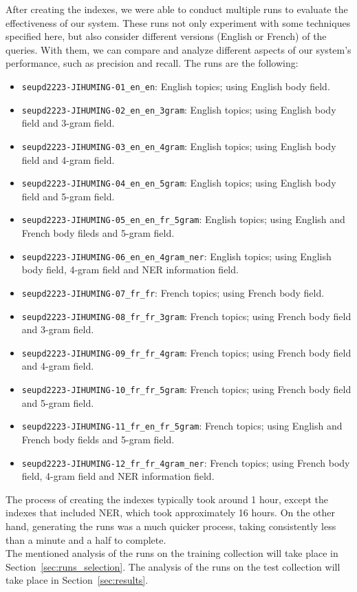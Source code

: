 After creating the indexes, we were able to conduct multiple runs to evaluate the effectiveness of our system.
These runs not only experiment with some techniques specified here, but also consider different versions (English
or French) of the queries.
With them, we can compare and analyze different aspects of our system's performance, such as precision and recall.
The runs are the following:
\begin{itemize}
	\item \texttt{seupd2223-JIHUMING-01\_en\_en}: English topics; using English body field.
	\item \texttt{seupd2223-JIHUMING-02\_en\_en\_3gram}: English topics; using English body field and 3-gram field.
	\item \texttt{seupd2223-JIHUMING-03\_en\_en\_4gram}: English topics; using English body field and 4-gram field.
	\item \texttt{seupd2223-JIHUMING-04\_en\_en\_5gram}: English topics; using English body field and 5-gram field.
	\item \texttt{seupd2223-JIHUMING-05\_en\_en\_fr\_5gram}: English topics; using English and French body fileds and 5-gram field.
	\item \texttt{seupd2223-JIHUMING-06\_en\_en\_4gram\_ner}: English topics; using English body field, 4-gram field and NER information field.
	\item \texttt{seupd2223-JIHUMING-07\_fr\_fr}: French topics; using French body field.
	\item \texttt{seupd2223-JIHUMING-08\_fr\_fr\_3gram}: French topics; using French body field and 3-gram field.
	\item \texttt{seupd2223-JIHUMING-09\_fr\_fr\_4gram}: French topics; using French body field and 4-gram field.
	\item \texttt{seupd2223-JIHUMING-10\_fr\_fr\_5gram}: French topics; using French body field and 5-gram field.
	\item \texttt{seupd2223-JIHUMING-11\_fr\_en\_fr\_5gram}: French topics; using English and French body fields and 5-gram field.
	\item \texttt{seupd2223-JIHUMING-12\_fr\_fr\_4gram\_ner}: French topics; using French body field, 4-gram field and NER information field.
\end{itemize}

The process of creating the indexes typically took around 1 hour, except the indexes that included NER, which took
approximately 16 hours.
On the other hand, generating the runs was a much quicker process, taking consistently less than a minute and a half to
complete.\\

The mentioned analysis of the runs on the training collection will take place in Section~\ref{sec:runs_selection}.
The analysis of the runs on the test collection will take place in Section~\ref{sec:results}.
